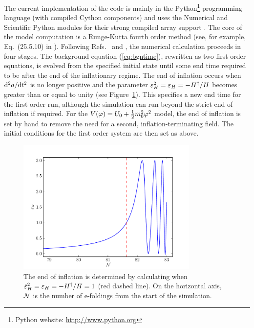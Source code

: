 The current implementation of the code is mainly in the Python\footnote{Python
website: \url{http://www.python.org}} programming language (with compiled Cython
components) and uses the
Numerical and Scientific Python modules for their strong compiled array support
\cite{scipy}. The core of the model computation is a
Runge-Kutta fourth order method (see, for example, Eq.~(25.5.10) in
\cite{abramowitz+stegun}).  Following
Refs.~\cite{Martin:2006rs} and \cite{Ringeval:2007am}, the numerical calculation
proceeds in four stages. The background equation (\ref{eq:bgntime}),
rewritten as two first order equations, is
evolved from the specified initial state until some end time required
to be after the end of the inflationary regime.  The end of inflation
occurs when $\mathrm{d}^2a/\mathrm{d} t^2$ is no longer positive and the parameter
$\bar{\varepsilon}^2_H = \varepsilon_H= -H^{\dagger}/H$ becomes greater than or
equal to unity
(see Figure~\ref{fig:eps}). This specifies a new end time for the first
order run, although the simulation can run beyond the strict end of
inflation if required. For the $V(\varphi)=U_0 + \frac{1}{2} m_0^2 \varphi^2$ model, the end of inflation is
set by hand to remove the need for a second, inflation-terminating field. The initial
conditions for the first order system are then set as above.
%
\begin{figure}[htbp]
\centering
 \includegraphics[width=0.8\textwidth]{./numerical/graphs/bgepsilon}
 \caption[The Value of $\varepsilon_H$ Near the End of Inflation]{The end of
inflation is
determined by calculating when
   $\bar{\varepsilon}^2_H = \varepsilon_H=-H^{\dagger}/H=1$ (red dashed line). On the
horizontal axis,
   $\mathcal{N}$ is the number of e-foldings from the start of the
   simulation.}
\label{fig:eps}
\end{figure}


